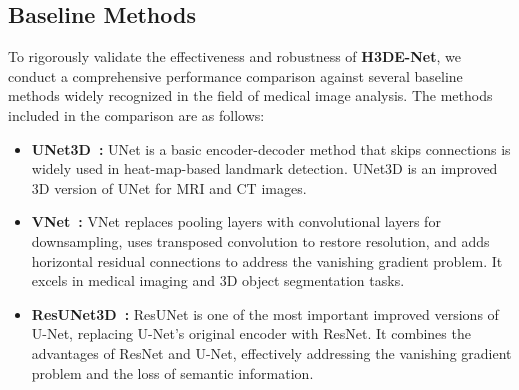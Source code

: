 \subsection{Baseline Methods}
To rigorously validate the effectiveness and robustness of \textbf{H3DE-Net}, we conduct a comprehensive performance comparison against several baseline methods widely recognized in the field of medical image analysis. The methods included in the comparison are as follows:

\begin{itemize}
    \item \textbf{UNet3D~\cite{3dunet}:} UNet is a basic encoder-decoder method that skips connections is widely used in heat-map-based landmark detection. UNet3D is an improved 3D version of UNet for MRI and CT images.
    
    \item \textbf{VNet~\cite{3dvnet}:} VNet replaces pooling layers with convolutional layers for downsampling, uses transposed convolution to restore resolution, and adds horizontal residual connections to address the vanishing gradient problem. It excels in medical imaging and 3D object segmentation tasks.
    
    \item \textbf{ResUNet3D~\cite{3dresunet}:} ResUNet is one of the most important improved versions of U-Net, replacing U-Net’s original encoder with ResNet. It combines the advantages of ResNet and U-Net, effectively addressing the vanishing gradient problem and the loss of semantic information.
    

\end{itemize}
